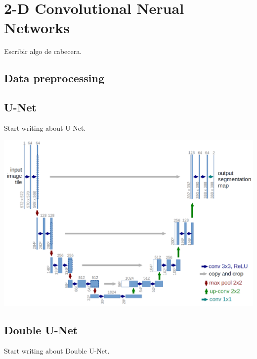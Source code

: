 \chapter{2-D Convolutional Nerual Networks}
\label{3.2D_CNN}

Escribir algo de cabecera.


\section{Data preprocessing}

\newpage
\section{U-Net}
Start writing about U-Net.


\begin{center}
\hspace*{15pt}
\includegraphics[width=\textwidth]{images/unet.png}
\end{center}



%

\newpage
\section{Double U-Net}
Start writing about Double U-Net.

